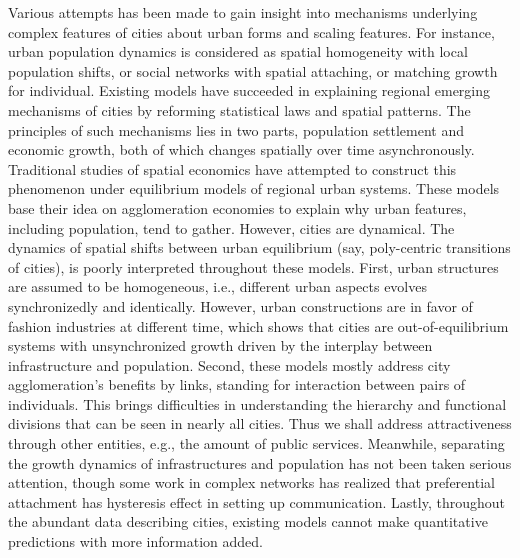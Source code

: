 \documentclass[reprint,unsortedaddress,amsmath,amssymb,aps,prl,showkeys]{revtex4-2}
\begin{document}
Various attempts has been made to gain insight into mechanisms underlying complex features of cities about urban forms and scaling features. For instance, urban population dynamics is considered as spatial homogeneity with local population shifts\cite{PhysRevLett.79.523}, or social networks with spatial attaching\cite{PhysRevX.4.011008,pan2013urban}, or matching growth for individual\cite{Li2017Simple}. Existing models have succeeded in explaining regional emerging mechanisms of cities\cite{PhysRevLett.79.523} by reforming statistical laws and spatial patterns\cite{gabaix1999zipf's,clark1951urban}. The principles of such mechanisms lies in two parts, population settlement and economic growth, both of which changes spatially over time asynchronously. Traditional studies of spatial economics have attempted to construct this phenomenon under equilibrium models of regional urban systems\cite{batty1992form}. These models base their idea on agglomeration economies to explain why urban features, including population, tend to gather. However, cities are dynamical\cite{batty1971modelling}. The dynamics of spatial shifts between urban equilibrium (say, poly-centric transitions of cities), is poorly interpreted throughout these models. 
First, %
urban structures are assumed to be homogeneous, i.e., different urban aspects evolves synchronizedly and identically. However, urban constructions are in favor of fashion industries at different time, which shows that cities are out-of-equilibrium systems with unsynchronized growth driven by the interplay between infrastructure and population. 
Second, these models mostly address city agglomeration's benefits by links\cite{Barabasi509}, standing for interaction between pairs of individuals. This brings difficulties in understanding the hierarchy and functional divisions that can be seen in nearly all cities\cite{bassolas2019hierarchical}. Thus we shall address attractiveness through other entities, e.g., the amount of public services. Meanwhile, separating the growth dynamics of infrastructures and population has not been taken serious attention, though some work in complex networks has realized that preferential attachment has hysteresis effect in setting up communication\cite{foster2010communities,hu2008urban}. 
Lastly, throughout the abundant data describing cities, existing models cannot make quantitative predictions with more information added.%
\end{document}
